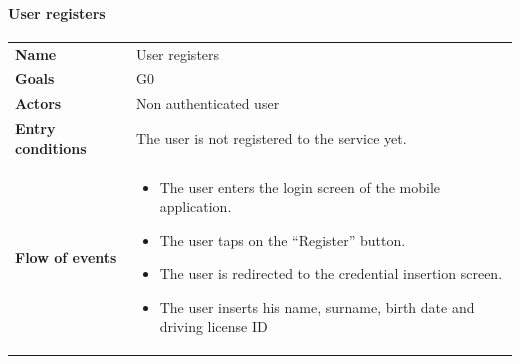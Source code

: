 \documentclass[]{article}
\providecommand{\tightlist}{%
  \setlength{\itemsep}{0pt}\setlength{\parskip}{0pt}}
\let\oldparagraph\paragraph
\renewcommand{\paragraph}[1]{\oldparagraph{#1}\mbox{}}
\begin{document}
\newpage

\paragraph{User registers}\label{user-registers}

\begin{longtable}[]{@{}ll@{}}
\toprule
\begin{minipage}[t]{0.29\columnwidth}\raggedright\strut
\textbf{Name}\strut
\end{minipage} & \begin{minipage}[t]{0.65\columnwidth}\raggedright\strut
User registers\strut
\end{minipage}\tabularnewline
\begin{minipage}[t]{0.29\columnwidth}\raggedright\strut
\textbf{Goals}\strut
\end{minipage} & \begin{minipage}[t]{0.65\columnwidth}\raggedright\strut
G0\strut
\end{minipage}\tabularnewline
\begin{minipage}[t]{0.29\columnwidth}\raggedright\strut
\textbf{Actors}\strut
\end{minipage} & \begin{minipage}[t]{0.65\columnwidth}\raggedright\strut
Non authenticated user\strut
\end{minipage}\tabularnewline
\begin{minipage}[t]{0.29\columnwidth}\raggedright\strut
\textbf{Entry conditions}\strut
\end{minipage} & \begin{minipage}[t]{0.65\columnwidth}\raggedright\strut
The user is not registered to the service yet.\strut
\end{minipage}\tabularnewline
\begin{minipage}[t]{0.29\columnwidth}\raggedright\strut
\textbf{Flow of events}\strut
\end{minipage} & \begin{minipage}[t]{0.65\columnwidth}\raggedright\strut
\begin{itemize}
\tightlist
\item
  The user enters the login screen of the mobile application.
\item
  The user taps on the ``Register'' button.
\item
  The user is redirected to the credential insertion screen.
\item
  The user inserts his name, surname, birth date and driving license ID

\end{itemize}
\end{minipage}
\end{longtable}
\end{document}
